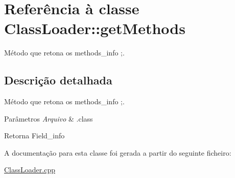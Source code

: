 \hypertarget{class_class_loader_1_1get_methods}{}\section{Referência à classe Class\+Loader\+:\+:get\+Methods}
\label{class_class_loader_1_1get_methods}


Método que retona os methods\+\_\+info ;.  




\subsection{Descrição detalhada}
Método que retona os methods\+\_\+info ;. 


\begin{DoxyParams}{Parâmetros}
{\em Arquivo} & .class \\
\hline
\end{DoxyParams}
\begin{DoxyReturn}{Retorna}
Field\+\_\+info 
\end{DoxyReturn}


A documentação para esta classe foi gerada a partir do seguinte ficheiro\+:\begin{DoxyCompactItemize}
\item 
\hyperlink{_class_loader_8cpp}{Class\+Loader.\+cpp}\end{DoxyCompactItemize}
